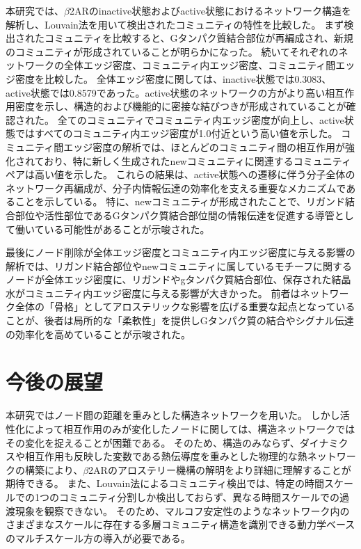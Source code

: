 本研究では、$\beta$2ARのinactive状態およびactive状態におけるネットワーク構造を解析し、Louvain法を用いて検出されたコミュニティの特性を比較した。
まず検出されたコミュニティを比較すると、Gタンパク質結合部位が再編成され、新規のコミュニティが形成されていることが明らかになった。
続いてそれぞれのネットワークの全体エッジ密度、コミュニティ内エッジ密度、コミュニティ間エッジ密度を比較した。
全体エッジ密度に関しては、inactive状態では0.3083、active状態では0.8579であった。active状態のネットワークの方がより高い相互作用密度を示し、構造的および機能的に密接な結びつきが形成されていることが確認された。
全てのコミュニティでコミュニティ内エッジ密度が向上し、active状態ではすべてのコミュニティ内エッジ密度が1.0付近という高い値を示した。
コミュニティ間エッジ密度の解析では、ほとんどのコミュニティ間の相互作用が強化されており、特に新しく生成されたnewコミュニティに関連するコミュニティペアは高い値を示した。
これらの結果は、active状態への遷移に伴う分子全体のネットワーク再編成が、分子内情報伝達の効率化を支える重要なメカニズムであることを示している。
特に、newコミュニティが形成されたことで、リガンド結合部位や活性部位であるGタンパク質結合部位間の情報伝達を促進する導管として働いている可能性があることが示唆された。

最後にノード削除が全体エッジ密度とコミュニティ内エッジ密度に与える影響の解析では、リガンド結合部位やnewコミュニティに属しているモチーフに関するノードが全体エッジ密度に、リガンドやgタンパク質結合部位、保存された結晶水がコミュニティ内エッジ密度に与える影響が大きかった。
前者はネットワーク全体の「骨格」としてアロステリックな影響を広げる重要な起点となっていることが、後者は局所的な「柔軟性」を提供しGタンパク質の結合やシグナル伝達の効率化を高めていることが示唆された。

\section{今後の展望}
本研究ではノード間の距離を重みとした構造ネットワークを用いた。
しかし活性化によって相互作用のみが変化したノードに関しては、構造ネットワークではその変化を捉えることが困難である。
そのため、構造のみならず、ダイナミクスや相互作用も反映した変数である熱伝導度を重みとした物理的な熱ネットワークの構築により、$\beta$2ARのアロステリー機構の解明をより詳細に理解することが期待できる。
また、Louvain法によるコミュニティ検出では、特定の時間スケールでの1つのコミュニティ分割しか検出しておらず、異なる時間スケールでの過渡現象を観察できない。
そのため、マルコフ安定性のようなネットワーク内のさまざまなスケールに存在する多層コミュニティ構造を識別できる動力学ベースのマルチスケール方の導入が必要である。
